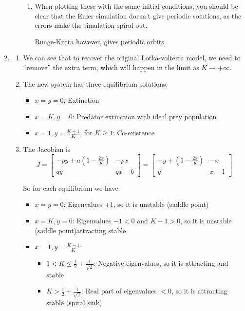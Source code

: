 \begin{enumerate}
\begin{enumerate}
\begin{enumerate}
		\item When plotting these with the same initial conditions, you should be clear that the Euler simulation doesn't give periodic solutions, as the errors make the simulation spiral out.
		
		Runge-Kutta however, gives periodic orbits.
		
		
	\end{enumerate}
		
	
\end{enumerate}
	
	
	
	
\item
\begin{enumerate}
	\item  We can see that to recover the original Lotka-volterra model, we need to ``remove'' the extra term, which will happen in the limit as $K \to +\infty$.
	
	\item The new system has three equilibrium solutions:
	\begin{itemize}
		\item $x=y=0$: Extinction
		\item $x=K, y=0$: Predator extinction with ideal prey population
		\item $x=1, y=\frac{K-1}{K}$, for $K\geq 1$: Co-existence
	\end{itemize}
	
	\item The Jacobian is
	\[
	J = \begin{bmatrix}
		-py+a\left(1-\frac{2x}{K}\right) & -px \\
		qy & qx-b
	\end{bmatrix}
	= \begin{bmatrix}
		-y+\left(1-\frac{2x}{K}\right) & -x \\
		y & x-1
	\end{bmatrix}
	\]
	
	So for each equilibrium we have:
	\begin{itemize}
		\item $x=y=0$: Eigenvalues $\pm 1$, so it is unstable (saddle point)
		\item $x=K, y=0$: Eigenvalues $-1<0$ and $K-1>0$, so it is unstable (saddle point)attracting stable
		
		\item $x=1, y = \frac{K-1}{K}$: 
		\begin{itemize}
			\item[] $1 < K \leq  \frac12+\frac{1}{\sqrt{2}}$: Negative eigenvalues, so it is attracting and stable
			\item[] $K > \frac12+\frac{1}{\sqrt{2}}$: Real part of eigenvalues $<0$, so it is attracting stable (spiral sink)	
		\end{itemize}
	\end{itemize}


\end{enumerate}
\end{enumerate}
